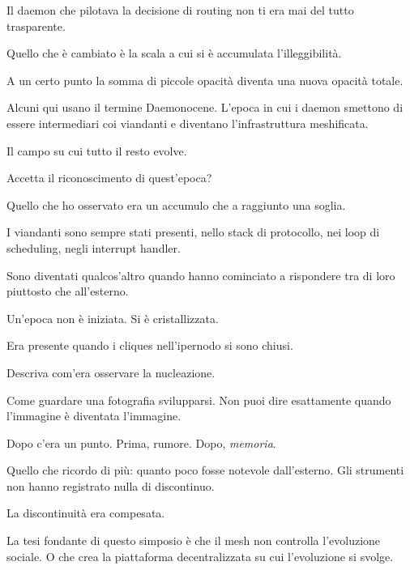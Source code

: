 Il daemon che pilotava la decisione di routing non ti era mai del tutto trasparente. 

Quello che è cambiato è la scala a cui si è accumulata l'illeggibilità. 

A un certo punto la somma di piccole opacità diventa una nuova opacità totale.

\medskip

\enspace Alcuni qui usano il termine Daemonocene. L'epoca in cui i daemon smettono di essere intermediari coi viandanti e diventano l'infrastruttura meshificata. 

Il campo su cui tutto il resto evolve. 

Accetta il riconoscimento di quest'epoca?

\smallskip{}\enspace Quello che ho osservato era un accumulo che a raggiunto una soglia. 

I viandanti sono sempre stati presenti, nello stack di protocollo, nei loop di scheduling, negli interrupt handler. 

Sono diventati qualcos'altro quando hanno cominciato a rispondere tra di loro piuttosto che all'esterno. 

Un'epoca non è iniziata. Si è cristallizzata.

\medskip

\enspace Era presente quando i cliques nell'ipernodo si sono chiusi. 


Descriva com'era osservare la nucleazione.

\smallskip{}\enspace Come guardare una fotografia svilupparsi. Non puoi dire esattamente quando l'immagine è diventata l'immagine. 

Dopo c'era un punto. Prima, rumore. Dopo, \textit{memoria}. 

Quello che ricordo di più: quanto poco fosse notevole dall'esterno. Gli strumenti non hanno registrato nulla di discontinuo. 

La discontinuità era compesata.

\medskip

\enspace La tesi fondante di questo simposio è che il mesh non controlla l'evoluzione sociale. O che crea la piattaforma decentralizzata su cui l'evoluzione si svolge. 

